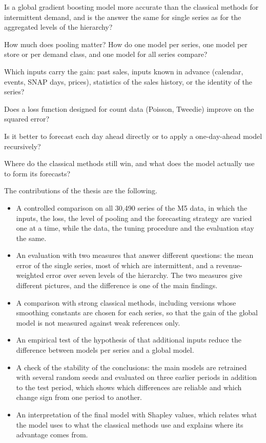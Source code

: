 \begin{description}[leftmargin=1.5cm,style=nextline]
\item[RQ1] Is a global gradient boosting model more accurate than the classical methods for intermittent
  demand, and is the answer the same for single series as for the aggregated levels of the hierarchy?
\item[RQ2] How much does pooling matter? How do one model per series, one model per store or per demand
  class, and one model for all series compare?
\item[RQ3] Which inputs carry the gain: past sales, inputs known in advance (calendar, events, SNAP days,
  prices), statistics of the sales history, or the identity of the series?
\item[RQ4] Does a loss function designed for count data (Poisson, Tweedie) improve on the squared error?
\item[RQ5] Is it better to forecast each day ahead directly or to apply a one-day-ahead model recursively?
\item[RQ6] Where do the classical methods still win, and what does the model actually use to form its
  forecasts?
\end{description}

The contributions of the thesis are the following.

\begin{itemize}
\item A controlled comparison on all 30{,}490 series of the M5 data, in which the inputs, the loss, the
  level of pooling and the forecasting strategy are varied one at a time, while the data, the tuning
  procedure and the evaluation stay the same.
\item An evaluation with two measures that answer different questions: the mean error of the single series,
  most of which are intermittent, and a revenue-weighted error over seven levels of the hierarchy. The two
  measures give different pictures, and the difference is one of the main findings.
\item A comparison with strong classical methods, including versions whose smoothing constants are chosen
  for each series, so that the gain of the global model is not measured against weak references only.
\item An empirical test of the hypothesis of \citet{tsantilis2025} that additional inputs reduce the
  difference between models per series and a global model.
\item A check of the stability of the conclusions: the main models are retrained with several random seeds
  and evaluated on three earlier periods in addition to the test period, which shows which differences are
  reliable and which change sign from one period to another.
\item An interpretation of the final model with Shapley values, which relates what the model uses to what
  the classical methods use and explains where its advantage comes from.
\end{itemize}


